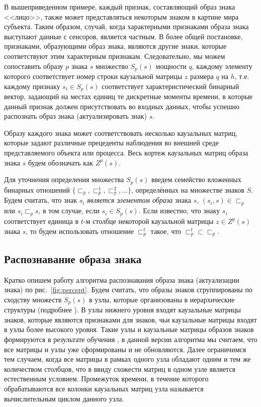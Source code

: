 \documentclass[12pt]{scrartcl}
\begin{document}
	В вышеприведенном примере, каждый признак, составляющий образ знака <<лицо>>, также может представляться некоторым знаком в картине мира субъекта. Таким образом, случай, когда характерными признаками образа знака выступают данные с сенсоров, является частным. В более общей постановке, признаками, образующими образ знака, являются другие знаки, которые соответствуют этим характерным признакам. Следовательно, мы можем сопоставить образу $p$ знака $s$ множество $S_p(s)$ мощности $q$, каждому элементу которого соответствует номер строки каузальной матрицы $z$ размера $q$ на $h$, т.е. каждому признаку $s_i\in S_p(s)$ соответствует характеристический бинарный вектор, задающий на местах единиц те дискретные моменты времени, в которые данный признак должен присутствовать во входных данных, чтобы успешно распознать образ знака (актуализировать знак) $s$. 
	
	Образу каждого знака может соответствовать несколько каузальных матриц, которые задают различные прецеденты наблюдения во внешней среде представляемого объекта или процесса. Весь кортеж каузальных матриц образа знака $s$ будем обозначать как $Z^p(s)$. 
		
	Для уточнения определения множества $S_p(s)$ введем семейство вложенных бинарных отношений $\{\sqsubset_p,\sqsubset_p^1,\sqsubset_p^2,\dots\}$, определённых на множестве знаков $S$. Будем считать, что знак $s_i$ \textit{является элементом образа} знака $s$, $(s_i,s)\in\sqsubset_p$ или $s_i\sqsubset_p s$, в том случае, если $s_i\in S_p(s)$. Если известно, что знаку $s_i$ соответствует единица в $t$-м столбце некоторой каузальной матрицы $z\in Z^p(s)$ знака $s$, то будем использовать отношение $\sqsubset_p^t$ такое, что  $\sqsubset_p^t\subset \sqsubset_p$.
	
	\subsection{Распознавание образа знака}\label{subsec:actual}
	
	Кратко опишем работу алгоритма распознавания образа знака (актуализации знака) по рис.~\ref{fig:percept}. Будем считать, что образы знаков сгруппированы по сходству множеств $S_p(s)$ в узлы, которые организованы в иерархические структуры (подробнее \cite{Panov2014d}). В узлы нижнего уровня входят каузальные матрицы знаков, которые являются признаками для знаков, чьи каузальные матрицы входят в узлы более высокого уровня. Такие узлы и каузальные матрицы образов знаков формируются в результате обучения \cite{Panov2014d,Skrynnik2016}, в данной версии алгоритма мы считаем, что все матрицы и узлы уже сформированы и не обновляются. Далее ограничимся тем случаем, когда все матрицы в рамках одного узла обладают одним и тем же количеством столбцов, что в ввиду схожести матриц в одном узле является естественным условием. Промежуток времени, в течение которого обрабатываются все колонки каузальных матриц узла называется вычислительным циклом данного узла.
	
\end{document}

